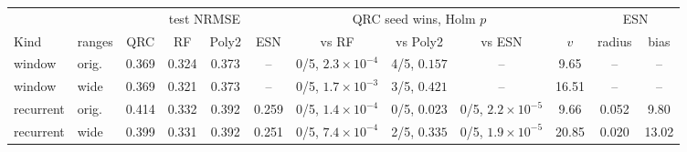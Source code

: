 \begin{tabular}{llcccccccccc}
\toprule
 & & \multicolumn{4}{c}{test NRMSE} & \multicolumn{3}{c}{QRC seed wins, Holm $p$} & & \multicolumn{2}{c}{ESN} \\
\cmidrule(lr){3-6}\cmidrule(lr){7-9}\cmidrule(lr){11-12}
Kind & ranges & QRC & RF & Poly2 & ESN & vs RF & vs Poly2 & vs ESN & $v$ & radius & bias \\
\midrule
window & orig. & 0.369 & 0.324 & 0.373 & -- & 0/5, $2.3\times10^{-4}$ & 4/5, $0.157$ & -- & 9.65 & -- & -- \\
window & wide & 0.369 & 0.321 & 0.373 & -- & 0/5, $1.7\times10^{-3}$ & 3/5, $0.421$ & -- & 16.51 & -- & -- \\
\midrule
recurrent & orig. & 0.414 & 0.332 & 0.392 & 0.259 & 0/5, $1.4\times10^{-4}$ & 0/5, $0.023$ & 0/5, $2.2\times10^{-5}$ & 9.66 & 0.052 & 9.80 \\
recurrent & wide & 0.399 & 0.331 & 0.392 & 0.251 & 0/5, $7.4\times10^{-4}$ & 2/5, $0.335$ & 0/5, $1.9\times10^{-5}$ & 20.85 & 0.020 & 13.02 \\
\bottomrule
\end{tabular}
